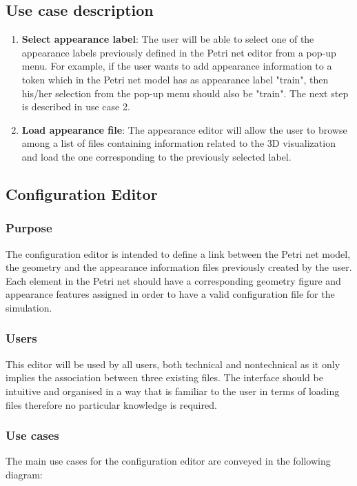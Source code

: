 \subsection{Use case description}

\begin{enumerate}
\item \textbf{Select appearance label}: The user will be able to select one of the appearance labels previously defined in the Petri net editor from a pop-up menu. For example, if the user wants to add appearance information to a token which in the Petri net model has as appearance label "train", then his/her selection from the pop-up menu should also be "train". The next step is described in use case 2. 
\item \textbf{Load appearance file}: The appearance editor will allow the user to browse among a list of files containing information related to the 3D visualization and load the one corresponding to the previously selected label.  
\end{enumerate}

   
 
\subsection{Configuration Editor}
\subsubsection{Purpose}
The configuration editor is intended to define a link between the Petri net model, the geometry and the appearance information files previously created by the user. Each element in the Petri net should have a corresponding geometry figure and appearance features assigned in order to have a valid configuration file for the simulation.   
\subsubsection{Users}
This editor will be used by all users, both technical and nontechnical as it only implies the association between three existing files. The interface should be intuitive and organised in a way that is familiar to the user in terms of loading files therefore no particular knowledge is required. 
\subsubsection{Use cases}
The main use cases for the configuration editor are conveyed in the following diagram: 

